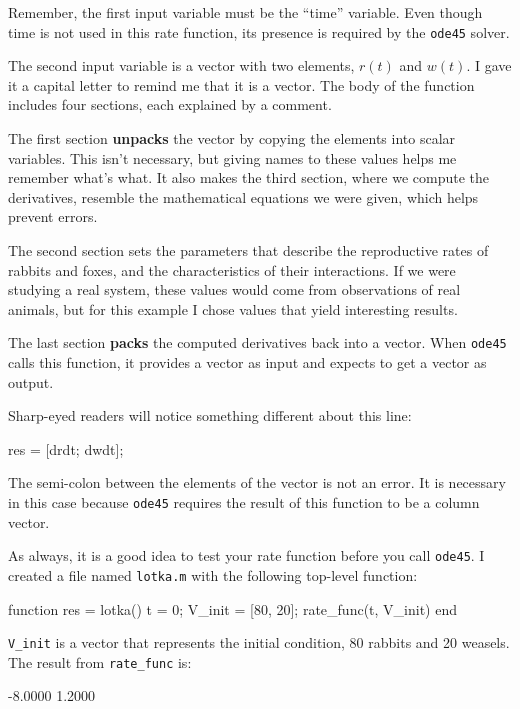 \documentclass[
]{book}
\numberwithin{Answer}{chapter}
\numberwithin{Exercise}{chapter}
\begin{document}
Remember, the first input variable must be the ``time'' variable.
Even though time is not used in this rate function, its presence is required by the {\tt ode45} solver.

The second input variable is a vector with two elements,
$r(t)$ and $w(t)$.  I gave it a capital letter to remind me that it
is a vector.  The body of the function includes four sections,
each explained by a comment.

The first section {\bf unpacks} the vector by copying the elements
into scalar variables.  This isn't necessary, but giving names to
these values helps me remember what's what.  It also makes the third
section, where we compute the derivatives, resemble the mathematical
equations we were given, which helps prevent errors.

The second section sets the parameters that describe the
reproductive rates of rabbits and foxes, and the characteristics of
their interactions.  If we were studying a real system, these values
would come from observations of real animals, but for this example
I chose values that yield interesting results.

The last section {\bf packs} the computed derivatives back into a
vector.  When {\tt ode45} calls this function, it provides a vector
as input and expects to get a vector as output.

Sharp-eyed readers will notice something different about this line:

\begin{code}
    res = [drdt; dwdt];
\end{code}

The semi-colon between the elements of the vector is not an error.  It
is necessary in this case because {\tt ode45} requires the result of
this function to be a column vector.

As always, it is a good idea to test your rate function before you call {\tt ode45}.  I created a file named {\tt lotka.m} with the following top-level function:

\begin{code}
function res = lotka()
    t = 0;
    V_init = [80, 20];
    rate_func(t, V_init)
end
\end{code}

\verb"V_init" is a vector that represents the initial condition, 80 rabbits and 20 weasels.  The result from \verb"rate_func" is:

\begin{code}
-8.0000
 1.2000
 \end{code}
  
\end{document}

